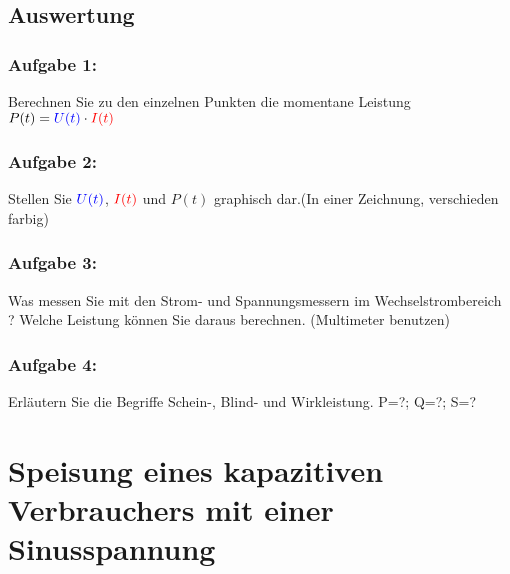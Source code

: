\documentclass[11pt,a4paper,titlepage,parskip=half]{scrreprt}
\begin{document}
            
            \subsection{Auswertung}
                \subsubsection{Aufgabe 1:}  Berechnen Sie zu den einzelnen Punkten die momentane Leistung $P(t) = \textcolor{blue}{U(t)} \cdot \textcolor{red}{I(t)}$ 

                \subsubsection{Aufgabe 2:}   Stellen Sie $\textcolor{blue}{U(t)}$, $\textcolor{red}{I(t)}$ und $P(t)$ graphisch dar.(In einer Zeichnung, verschieden farbig)
                
                \subsubsection{Aufgabe 3:}  Was messen Sie mit den Strom- und Spannungsmessern im Wechselstrombereich ? Welche Leistung können Sie daraus berechnen. (Multimeter benutzen)
               
                \subsubsection{Aufgabe 4:}   Erläutern Sie die Begriffe Schein-, Blind- und Wirkleistung.   P=?; Q=?; S=?
      
                         
                         
                
                 
        \section{Speisung eines kapazitiven Verbrauchers mit einer Sinusspannung}
\end{document}
